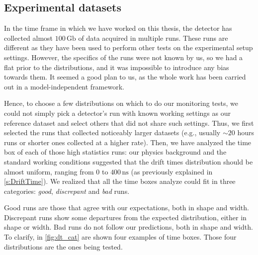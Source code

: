 \subsection{Experimental datasets}\label{sec:exp_timebox}

In the time frame in which we have worked on this thesis, the detector has collected almost $100\,\text{Gb}$ of data
acquired in multiple runs. These runs are different as they have been used to perform other tests on the experimental
setup settings. However, the specifics of the runs were not known by us, so we had a flat prior to the distributions,
and it was impossible to introduce any bias towards them. It seemed a good plan to us, as the whole work has been
carried out in a model-independent framework.

Hence, to choose a few distributions on which to do our monitoring tests, we could not simply pick a detector's run with
known working settings as our reference dataset and select others that did not share such settings. Thus, we first
selected the runs that collected noticeably larger datasets (e.g., usually $\sim 20$ hours runs or shorter ones
collected at a higher rate). Then, we have analyzed the time box of each of those high statistics runs: our physics
background and the standard working conditions suggested that the drift times distribution should be almost uniform,
ranging from $0$ to $400\,\si{\nano\second}$ (as previously explained in \autoref{s:DriftTime}). We realized that all
the time boxes analyze could fit in three categories: \textit{good}, \textit{discrepant} and \textit{bad} runs. 

Good runs are those that agree with our expectations, both in shape and width. Discrepant runs show some departures from
the expected distribution, either in shape or width. Bad runs do not follow our predictions, both in shape and width. To
clarify, in \autoref{fig:dt_cat} are shown four examples of time boxes. Those four distributions are the ones being
tested.

